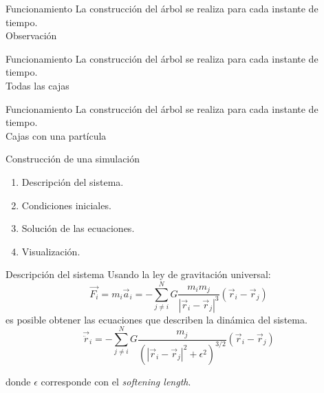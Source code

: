 \documentclass[handout]{beamer}
\begin{document}
\begin{frame}{Funcionamiento}
	La construcci\'on del \'arbol se realiza para cada instante de tiempo.
	\centering
	\\
	Observaci\'on
\end{frame}
\begin{frame}{Funcionamiento}
	La construcci\'on del \'arbol se realiza para cada instante de tiempo.
	\centering
	\\
	Todas las cajas
\end{frame}
\begin{frame}{Funcionamiento}
	La construcci\'on del \'arbol se realiza para cada instante de tiempo.
	\centering
	\\
	Cajas con una part\'icula
\end{frame}
\begin{frame}{Construcci\'on de una simulaci\'on}
	\begin{enumerate}
		\item Descripci\'on del sistema. \pause
		\item Condiciones iniciales. \pause
		\item Soluci\'on de las ecuaciones. \pause
		\item Visualizaci\'on.
	\end{enumerate}
\end{frame}
\begin{frame}{Descripci\'on del sistema}
	Usando la ley de gravitaci\'on universal:
	\begin{equation}
		\vec{F_i} = m_i\vec{a}_i = - \sum\limits_{j\neq i}^N G\dfrac{m_im_j}{|\vec{r}_i - \vec{r}_j|^3}\left(\vec{r}_i - \vec{r}_j\right)
	\end{equation}\pause
	es posible obtener las ecuaciones que describen la din\'amica del sistema.\pause
	\begin{equation}
		\vec{\ddot{r}}_i = - \sum\limits_{j\neq i}^N G\dfrac{m_j}{\left(|\vec{r}_i - \vec{r}_j|^2 + \epsilon^2\right)^{3/2}}\left(\vec{r}_i - \vec{r}_j\right)
	\end{equation}
	
	donde $\epsilon$ corresponde con el \textit{softening length}.
\end{frame}
\end{document}
